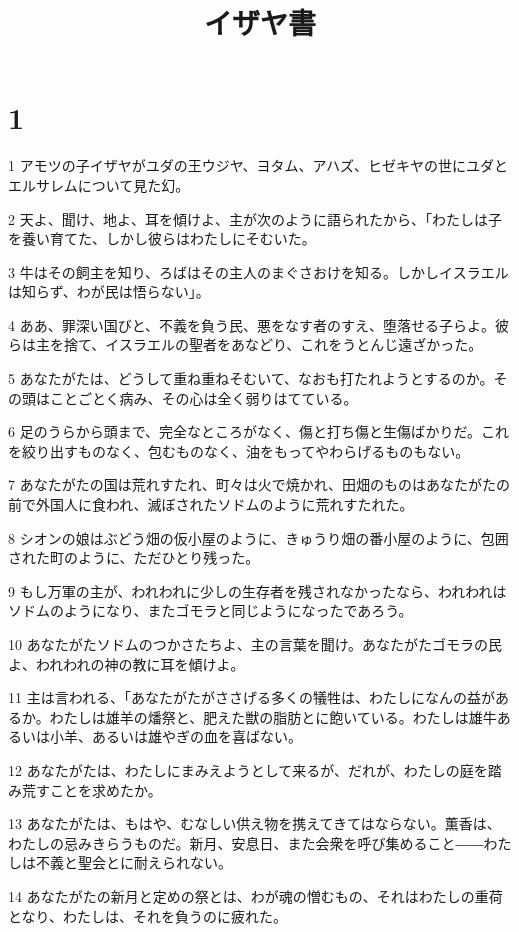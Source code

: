 

\title{イザヤ書}


\chapter{1}

\par 1 アモツの子イザヤがユダの王ウジヤ、ヨタム、アハズ、ヒゼキヤの世にユダとエルサレムについて見た幻。
\par 2 天よ、聞け、地よ、耳を傾けよ、主が次のように語られたから、「わたしは子を養い育てた、しかし彼らはわたしにそむいた。
\par 3 牛はその飼主を知り、ろばはその主人のまぐさおけを知る。しかしイスラエルは知らず、わが民は悟らない」。
\par 4 ああ、罪深い国びと、不義を負う民、悪をなす者のすえ、堕落せる子らよ。彼らは主を捨て、イスラエルの聖者をあなどり、これをうとんじ遠ざかった。
\par 5 あなたがたは、どうして重ね重ねそむいて、なおも打たれようとするのか。その頭はことごとく病み、その心は全く弱りはてている。
\par 6 足のうらから頭まで、完全なところがなく、傷と打ち傷と生傷ばかりだ。これを絞り出すものなく、包むものなく、油をもってやわらげるものもない。
\par 7 あなたがたの国は荒れすたれ、町々は火で焼かれ、田畑のものはあなたがたの前で外国人に食われ、滅ぼされたソドムのように荒れすたれた。
\par 8 シオンの娘はぶどう畑の仮小屋のように、きゅうり畑の番小屋のように、包囲された町のように、ただひとり残った。
\par 9 もし万軍の主が、われわれに少しの生存者を残されなかったなら、われわれはソドムのようになり、またゴモラと同じようになったであろう。
\par 10 あなたがたソドムのつかさたちよ、主の言葉を聞け。あなたがたゴモラの民よ、われわれの神の教に耳を傾けよ。
\par 11 主は言われる、「あなたがたがささげる多くの犠牲は、わたしになんの益があるか。わたしは雄羊の燔祭と、肥えた獣の脂肪とに飽いている。わたしは雄牛あるいは小羊、あるいは雄やぎの血を喜ばない。
\par 12 あなたがたは、わたしにまみえようとして来るが、だれが、わたしの庭を踏み荒すことを求めたか。
\par 13 あなたがたは、もはや、むなしい供え物を携えてきてはならない。薫香は、わたしの忌みきらうものだ。新月、安息日、また会衆を呼び集めること――わたしは不義と聖会とに耐えられない。
\par 14 あなたがたの新月と定めの祭とは、わが魂の憎むもの、それはわたしの重荷となり、わたしは、それを負うのに疲れた。
